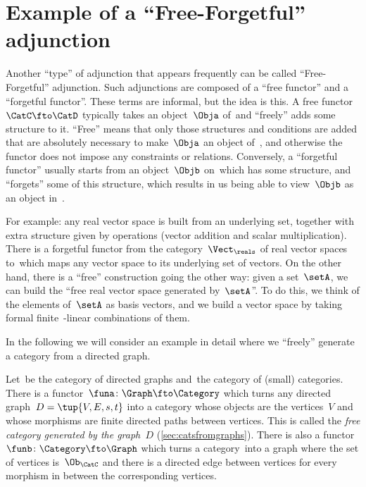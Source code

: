 

\section{Example of a ``Free-Forgetful'' adjunction}

Another ``type'' of adjunction that appears frequently can be called ``Free-Forgetful'' adjunction.
Such adjunctions are composed of a ``free functor'' and a ``forgetful functor''.
These terms are informal, but the idea is this.
A free functor~$\CatC \fto \CatD$ typically takes an object~$\Obja$ of~\CatC and ``freely'' adds some structure to it.
``Free'' means that only those structures and conditions are added that are absolutely necessary to make~$\Obja$ an object of~\CatD, and otherwise the functor does not impose any constraints or relations.
Conversely, a ``forgetful functor'' usually starts from an object~$\Objb$ on~\CatD which has some structure, and ``forgets'' some of this structure, which results in us being able to view~$\Objb$ as an object in~\CatC.

For example: any real vector space is built from an underlying set, together with extra structure given by operations (vector addition and scalar multiplication).
There is a forgetful functor from the category~$\Vect_{\reals}$ of real vector spaces to~\Set which maps any vector space to its underlying set of vectors.
On the other hand, there is a ``free'' construction going the other way: given a set~$\setA$, we can build the ``free real vector space generated by~$\setA$''.
To do this, we think of the elements of~$\setA$ as basis vectors, and we build a vector space by taking formal finite~\reals-linear combinations of them.

In the following we will consider an example in detail where we ``freely'' generate a category from a directed graph.

Let~\Graph be the category of directed graphs and~\Category the category of (small) categories.
There is a functor~$\funa \colon \Graph \fto \Category$ which turns any directed graph~$D = \tup{V,E, s,t}$ into a category whose objects are the vertices~$V$ and whose morphisms are finite directed paths between vertices.
This is called the \emph{free category generated by the graph~$D$} (\cref{sec:catsfromgraphs}).
There is also a functor~$\funb \colon \Category \fto \Graph$ which turns a category~\CatC into a graph where the set of vertices is~$\Ob_{\CatC}$ and there is a directed edge between vertices for every morphism in \CatC between the corresponding vertices.

